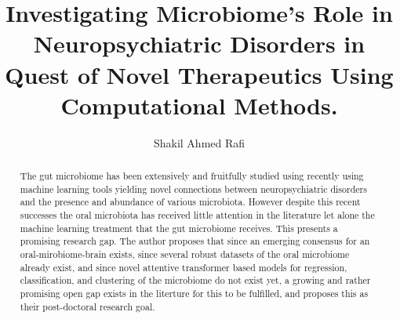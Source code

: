\documentclass{article}
\title{Investigating Microbiome's Role in Neuropsychiatric Disorders in Quest of Novel Therapeutics Using Computational Methods.}
\author{Shakil Ahmed Rafi}
\begin{document}
\maketitle
\begin{abstract}
	The gut microbiome has been extensively and fruitfully studied using recently using machine learning tools yielding novel connections between neuropsychiatric disorders and the presence and abundance of various microbiota. However despite this recent successes the oral microbiota has received little attention in the literature let alone the machine learning treatment that the gut microbiome receives. This presents a promising research gap. The author proposes that since an emerging consensus for an oral-mirobiome-brain exists, since several robust datasets of the oral microbiome already exist, and since novel attentive transformer based models for regression, classification, and clustering of the microbiome do not exist yet, a growing and rather promising open gap exists in the literture for this to be fulfilled, and proposes this as their post-doctoral research goal.
\end{abstract}
\noindent
\end{document}
